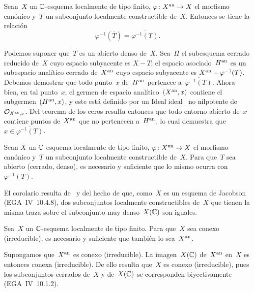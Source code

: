 \begin{proposition}
\label{XII.2.2}
Sean~$X$ un $\mathbb C$-esquema localmente de tipo finito,
$\varphi\colon X^{\mathrm{an}}\to X$ el morfismo canónico y~$T$ un subconjunto
localmente constructible de~$X$. Entonces se tiene la relación
$$
\varphi^{-1}(\overline{T})=\overline{\varphi^{-1}(T)}.
$$
\end{proposition}

Podemos suponer que~$T$ es un abierto denso de~$X$. Sea~$H$ el subesquema
cerrado reducido de~$X$ cuyo espacio subyacente es $X-T$; el espacio
asociado~$H^{\mathrm{an}}$ es un subespacio analítico cerrado de~$X^{\mathrm{an}}$ cuyo
espacio subyacente es $X^{\mathrm{an}}-\varphi^{-1}(T)$. Debemos demostrar que todo
punto~$x$ de~$H^{\mathrm{an}}$ pertenece a~$\overline{\varphi^{-1}(T)}$. Ahora bien,
en tal punto~$x$, el germen de espacio analítico~$(X^{\mathrm{an}},x)$ contiene el
subgermen~$(H^{\mathrm{an}},x)$, y este está definido por un
{Ideal}
{ideal}%
~no nilpotente de~$\mathcal{O}_{X^{\mathrm{an}},x}$. Del teorema de los ceros
\cite[~\S 4~cor]{XII.4} resulta entonces que todo entorno abierto
de~$x$ contiene puntos de~$X^{\mathrm{an}}$ que no pertenecen a~$H^{\mathrm{an}}$, lo cual
demuestra que $x\in\overline{\varphi^{-1}(T)}$.

\begin{corollaire}
\label{XII.2.3}
Sean
$X$ un $\mathbb C$-esquema localmente de tipo finito,
$\varphi\colon X^{\mathrm{an}}\to X$ el morfismo canónico y~$T$ un subconjunto
localmente constructible de~$X$. Para que~$T$ sea abierto (\resp cerrado,
\resp denso), es necesario y suficiente que lo mismo ocurra con
$\varphi^{-1}(T)$.
\end{corollaire}

El corolario resulta de~ y del hecho de que, como~$X$ es un
esquema de Jacobson (EGA~IV~10.4.8), dos subconjuntos localmente
constructibles de~$X$ que tienen la misma traza sobre el subconjunto muy
denso~$X(\mathbb C)$ son iguales.

\begin{proposition}
\label{XII.2.4}
Sea~$X$ un $\mathbb C$-esquema localmente de tipo finito. Para que~$X$ sea conexo
(\resp irreducible), es necesario y suficiente que también lo sea~$X^{\mathrm{an}}$.
\end{proposition}

Supongamos que~$X^{\mathrm{an}}$ es conexo (\resp irreducible). La imagen~$X(\mathbb C)$
de~$X^{\mathrm{an}}$ en~$X$ es entonces conexa (\resp irreducible). De ello resulta
que~$X$ es conexo (\resp irreducible), pues los subconjuntos cerrados de~$X$
y de~$X(\mathbb C)$ se corresponden biyectivamente (EGA~IV~10.1.2).


